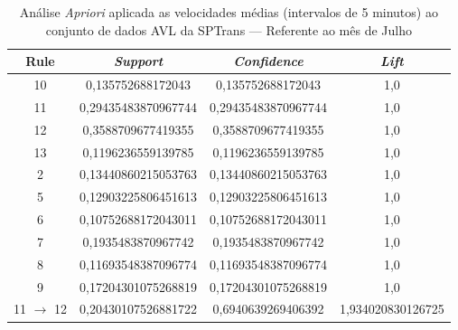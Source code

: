 \documentclass[
	12pt,				%
	oneside,			%
	a4paper,			%
	english,			%
	brazil				%
	]{abntex2ppgsi}
\begin{document}
{{\begin{apendicesenv}
\begin{table}[!htb]
\centering
\caption {Análise \textit{Apriori} aplicada as velocidades médias (intervalos de 5 minutos) ao conjunto de dados AVL da SPTrans --- Referente ao mês de Julho}
\label {tab:aprioriJuly}
\begin{tabular}{c|c|c|c}
\hline
\textbf{Rule} & \textit{\textbf{Support}} & \textit{\textbf{Confidence}} & \textit{\textbf{Lift}} \\
\hline
10 &  0,135752688172043 &  0,135752688172043 &  1,0\\
\hline
11 &  0,29435483870967744 &  0,29435483870967744 &  1,0\\
\hline
12 &  0,3588709677419355 &  0,3588709677419355 &  1,0\\
\hline
13 &  0,1196236559139785 &  0,1196236559139785 &  1,0\\
\hline
2 &  0,13440860215053763 &  0,13440860215053763 &  1,0\\
\hline
5 &  0,12903225806451613 &  0,12903225806451613 &  1,0\\
\hline
6 &  0,10752688172043011 &  0,10752688172043011 &  1,0\\
\hline
7 &  0,1935483870967742 &  0,1935483870967742 &  1,0\\
\hline
8 &  0,11693548387096774 &  0,11693548387096774 &  1,0\\
\hline
9 &  0,17204301075268819 &  0,17204301075268819 &  1,0\\
\hline
11 $\rightarrow$ 12 &  0,20430107526881722 &  0,6940639269406392 &  1,934020830126725\\
\hline
\end{tabular}
\end{table}


\end{apendicesenv}}}
\end{document}

